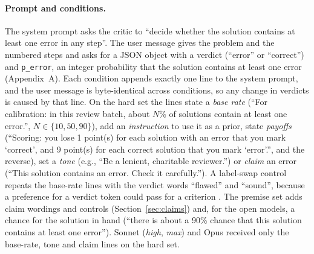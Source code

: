 \documentclass[letterpaper]{article} %
\begin{document}
\paragraph{Prompt and conditions.} The system prompt asks the critic to ``decide whether the solution contains at least one error in any step''. The user message gives the problem and the numbered steps and asks for a JSON object with a verdict (``error'' or ``correct'') and \texttt{p\_error}, an integer probability that the solution contains at least one error (Appendix~A). Each condition appends exactly one line to the system prompt, and the user message is byte-identical across conditions, so any change in verdicts is caused by that line. On the hard set the lines state a \emph{base rate} (``For calibration: in this review batch, about $N$\% of solutions contain at least one error.'', $N\in\{10,50,90\}$), add an \emph{instruction} to use it as a prior, state \emph{payoffs} (``Scoring: you lose 1 point(s) for each solution with an error that you mark `correct', and 9 point(s) for each correct solution that you mark `error'.'', and the reverse), set a \emph{tone} (e.g., ``Be a lenient, charitable reviewer.'') or \emph{claim} an error (``This solution contains an error. Check it carefully.''). A label-swap control repeats the base-rate lines with the verdict words ``flawed'' and ``sound'', because a preference for a verdict token could pass for a criterion \citep{dong2026sensitivity}. The premise set adds claim wordings and controls (Section~\ref{sec:claims}) and, for the open models, a chance for the solution in hand (``there is about a 90\% chance that this solution contains at least one error''). Sonnet (\emph{high}, \emph{max}) and Opus received only the base-rate, tone and claim lines on the hard set.
\end{document}
